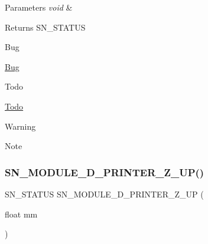 \begin{DoxyParams}{Parameters}
{\em void} & \\
\hline
\end{DoxyParams}
\begin{DoxyReturn}{Returns}
S\+N\+\_\+\+S\+T\+A\+T\+US 
\end{DoxyReturn}
\begin{DoxyRefDesc}{Bug}
\item[\hyperlink{bug__bug000009}{Bug}]\end{DoxyRefDesc}
\begin{DoxyRefDesc}{Todo}
\item[\hyperlink{todo__todo000009}{Todo}]\end{DoxyRefDesc}
\begin{DoxyWarning}{Warning}

\end{DoxyWarning}
\begin{DoxyNote}{Note}

\end{DoxyNote}
\mbox{\label{group__Module_ga4671a91d49ef53f67f1d203f18355c63}} 
\subsubsection{\texorpdfstring{S\+N\+\_\+\+M\+O\+D\+U\+L\+E\+\_\+D\+\_\+\+P\+R\+I\+N\+T\+E\+R\+\_\+\+Z\+\_\+\+U\+P()}{SN\_MODULE\_3D\_PRINTER\_Z\_UP()}}
{\footnotesize\ttfamily S\+N\+\_\+\+S\+T\+A\+T\+US S\+N\+\_\+\+M\+O\+D\+U\+L\+E\+\_\+D\+\_\+\+P\+R\+I\+N\+T\+E\+R\+\_\+\+Z\+\_\+\+UP (\begin{DoxyParamCaption}\item[{float}]{mm }\end{DoxyParamCaption})}


